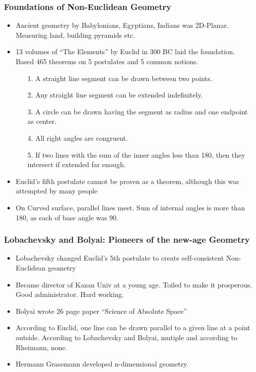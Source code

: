 \begin{frame}[fragile]
\frametitle{Foundations of Non-Euclidean Geometry}
\begin{itemize}
\item Ancient geometry by Babylonians, Egyptians, Indians was 2D-Planar. Measuring land, building pyramids etc.
\item 13 volumes of ``The Elements'' by Euclid in 300 BC laid the foundation. Based 465 theorems on 5 postulates and 5 common notions. %
	\begin{itemize}
	\item[1.] A straight line segment can be drawn between two points.
	\item[2.] Any straight line segment can be extended indefinitely.
	\item[3.] A circle can be drawn having the segment as radius and one endpoint as center.
	\item [4.] All right angles are congruent.
	\item [5.] If two lines with the sum of the inner angles less than 180, then they intersect if extended far enough.
	\end{itemize}
\item 
Euclid's fifth postulate cannot be proven as a theorem, although this was attempted by many people
\item On Curved surface, parallel lines meet. Sum of internal angles is more than 180, as each of base angle was 90.
\end{itemize}
\end{frame}

\begin{frame}[fragile]
\frametitle{Lobachevsky and Bolyai: Pioneers of the new-age Geometry}
\begin{itemize}
\item Lobachevsky changed Euclid's 5th postulate to create self-consistent Non-Euclidean geometry
\item Became director of Kazan Univ at a young age. Toiled to make it prosperous. Good administrator. Hard working.
\item  Bolyai wrote 26 page paper ``Science of Absolute Space''
\item According to Euclid, one line can be drawn parallel to a given line at a point outside. According to Lobachevsky and Bolyai, mutiple and according to Rheimann, none.
\item Hermann Grassmann developed n-dimensional geometry.
\end{itemize}
\end{frame}



